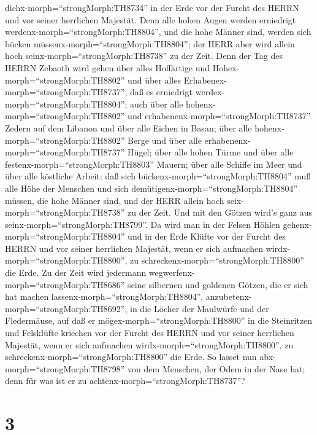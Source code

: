 dichx-morph=``strongMorph:TH8734'' in der Erde vor der Furcht des HERRN
und vor seiner herrlichen Majestät.  Denn alle hohen Augen
werden erniedrigt werdenx-morph=``strongMorph:TH8804'', und die hohe
Männer sind, werden sich bücken müssenx-morph=``strongMorph:TH8804'';
der HERR aber wird allein hoch seinx-morph=``strongMorph:TH8738'' zu der
Zeit.  Denn der Tag des HERRN Zebaoth wird gehen über alles
Hoffärtige und Hohex-morph=``strongMorph:TH8802'' und über alles
Erhabenex-morph=``strongMorph:TH8737'', daß es erniedrigt
werdex-morph=``strongMorph:TH8804'';  auch über alle
hohenx-morph=``strongMorph:TH8802'' und
erhabenenx-morph=``strongMorph:TH8737'' Zedern auf dem Libanon und über
alle Eichen in Basan;  über alle
hohenx-morph=``strongMorph:TH8802'' Berge und über alle
erhabenenx-morph=``strongMorph:TH8737'' Hügel;  über alle
hohen Türme und über alle festenx-morph=``strongMorph:TH8803'' Mauern;
 über alle Schiffe im Meer und über alle köstliche Arbeit:
 daß sich bückenx-morph=``strongMorph:TH8804'' muß alle
Höhe der Menschen und sich demütigenx-morph=``strongMorph:TH8804''
müssen, die hohe Männer sind, und der HERR allein hoch
seix-morph=``strongMorph:TH8738'' zu der Zeit.  Und mit den
Götzen wird's ganz aus seinx-morph=``strongMorph:TH8799''. 
Da wird man in der Felsen Höhlen gehenx-morph=``strongMorph:TH8804'' und
in der Erde Klüfte vor der Furcht des HERRN und vor seiner herrlichen
Majestät, wenn er sich aufmachen wirdx-morph=``strongMorph:TH8800'', zu
schreckenx-morph=``strongMorph:TH8800'' die Erde.  Zu der
Zeit wird jedermann wegwerfenx-morph=``strongMorph:TH8686'' seine
silbernen und goldenen Götzen, die er sich hat machen
lassenx-morph=``strongMorph:TH8804'',
anzubetenx-morph=``strongMorph:TH8692'', in die Löcher der Maulwürfe und
der Fledermäuse,  auf daß er
mögex-morph=``strongMorph:TH8800'' in die Steinritzen und Felsklüfte
kriechen vor der Furcht des HERRN und vor seiner herrlichen Majestät,
wenn er sich aufmachen wirdx-morph=``strongMorph:TH8800'', zu
schreckenx-morph=``strongMorph:TH8800'' die Erde.  So
lasset nun abx-morph=``strongMorph:TH8798'' von dem Menschen, der Odem
in der Nase hat; denn für was ist er zu
achtenx-morph=``strongMorph:TH8737''?

\hypertarget{section-2}{%
\section{3}\label{section-2}}

